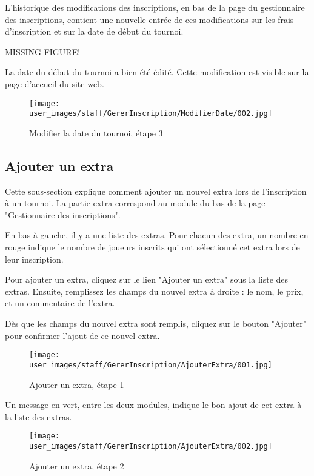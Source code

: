 L'historique des modifications des inscriptions, en bas de la page du gestionnaire des inscriptions, contient une nouvelle entrée de ces modifications sur les frais d'inscription et sur la date de début du tournoi.

MISSING FIGURE!

La date du début du tournoi a bien été édité. Cette modification est visible sur la page d'accueil du site web.

\begin{figure}[H]
\centering
\texttt{[image: user\_images/staff/GererInscription/ModifierDate/002.jpg]}
\caption{Modifier la date du tournoi, étape 3}
\end{figure}

\subsection{Ajouter un extra}

Cette sous-section explique comment ajouter un nouvel extra lors de l'inscription à un tournoi. La partie extra correspond au module du bas de la page "Gestionnaire des inscriptions".\newline

En bas à gauche, il y a une liste des extras. Pour chacun des extra, un nombre en rouge indique le nombre de joueurs inscrits qui ont sélectionné cet extra lors de leur inscription.\newline

Pour ajouter un extra, cliquez sur le lien "Ajouter un extra" sous la liste des extras. Ensuite, remplissez les champs du nouvel extra à droite : le nom, le prix, et un commentaire de l'extra.\newline

Dès que les champs du nouvel extra sont remplis, cliquez sur le bouton "Ajouter" pour confirmer l'ajout de ce nouvel extra.

\begin{figure}[H]
\centering
\texttt{[image: user\_images/staff/GererInscription/AjouterExtra/001.jpg]}
\caption{Ajouter un extra, étape 1}
\end{figure}

Un message en vert, entre les deux modules, indique le bon ajout de cet extra à la liste des extras.

\begin{figure}[H]
\centering
\texttt{[image: user\_images/staff/GererInscription/AjouterExtra/002.jpg]}
\caption{Ajouter un extra, étape 2}
\end{figure}

